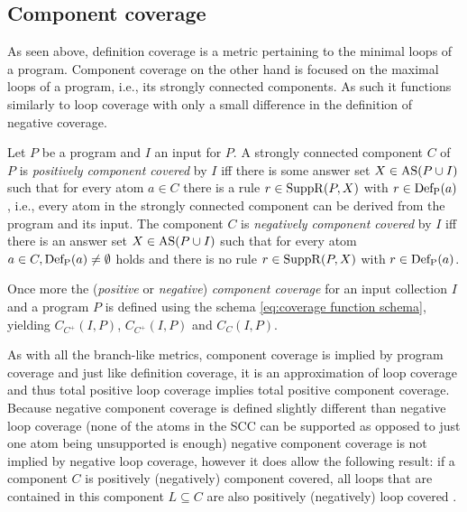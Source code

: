 \subsection{Component coverage}
\label{subsec:Coverage cetrics/Branch-like coverage/Component coverage}
As seen above, definition coverage is a metric pertaining to the minimal loops of a program. Component coverage on the other hand is focused on the maximal loops of a program, i.e., its strongly connected components. As such it functions similarly to loop coverage with only a small difference in the definition of negative coverage.

\begin{definition}
\label{def:component coverage}
    Let $P$ be a program and $I$ an input for $P$. A strongly connected component $C$ of $P$ is \emph{positively component covered} by $I$ iff there is some answer set \(X \in \operatorname{AS}(P \cup I)\) such that for every atom \(a \in C\) there is a rule \(r \in \operatorname{SuppR}(P, X)\) with \(r \in \operatorname{Def_P}(a)\), i.e., every atom in the strongly connected component can be derived from the program and its input.
    The component $C$ is \emph{negatively component covered} by $I$ iff there is an answer set \(X \in \operatorname{AS}(P \cup I)\) such that for every atom \(a \in C, \operatorname{Def_P}(a) \neq \emptyset\) holds and there is no rule \(r \in \operatorname{SuppR}(P, X)\) with \(r \in \operatorname{Def_P}(a)\).
\end{definition}

Once more the (\emph{positive} or \emph{negative}) \emph{component coverage} for an input collection $I$ and a program $P$ is defined using the schema \ref{eq:coverage function schema}, yielding \(C_{C^+}(I, P)\), \(C_{C^+}(I, P)\) and \(C_{C}(I, P)\).

As with all the branch-like metrics, component coverage is implied by program coverage and just like definition coverage, it is an approximation of loop coverage and thus total positive loop coverage implies total positive component coverage.
Because negative component coverage is defined slightly different than negative loop coverage (none of the atoms in the SCC can be supported as opposed to just one atom being unsupported is enough) negative component coverage is not implied by negative loop coverage, however it does allow the following result: if a component $C$ is positively (negatively) component covered, all loops that are contained in this component \(L \subseteq C\) are also positively (negatively) loop covered \cite[Theorem 7]{Jan+10}.


